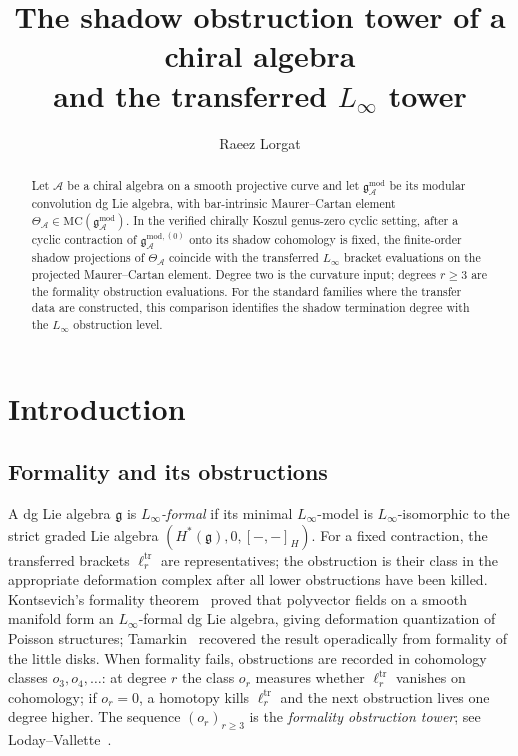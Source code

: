 \documentclass[11pt,reqno]{amsart}
\theoremstyle{definition}
\theoremstyle{remark}
\providecommand{\cA}{\mathcal{A}}
\providecommand{\MC}{\mathrm{MC}}
\providecommand{\fg}{\mathfrak{g}}
\providecommand{\gmod}{\mathfrak{g}^{\mathrm{mod}}_{\cA}}
\providecommand{\gmodzero}{\mathfrak{g}^{\mathrm{mod},(0)}_{\cA}}
\providecommand{\Linf}{L_\infty}
\numberwithin{equation}{section}
\begin{document}
\title[Genus-zero shadow and formality obstruction]
{The shadow obstruction tower of a chiral algebra\\
and the transferred $L_\infty$ tower}

\author{Raeez Lorgat}
\address{Department of Mathematics, Harvard University,
 Cambridge, MA 02138, USA}

\date{}

\begin{abstract}
Let $\cA$ be a chiral algebra on a smooth projective curve and
let $\gmod$ be its modular convolution dg Lie algebra, with
bar-intrinsic Maurer--Cartan element
$\Theta_{\cA}\in\MC(\gmod)$. In the verified chirally Koszul
genus-zero cyclic setting, after a cyclic contraction of
$\gmodzero$ onto its shadow cohomology is fixed, the finite-order
shadow projections of $\Theta_{\cA}$ coincide with the transferred
$\Linf$ bracket evaluations on the projected Maurer--Cartan
element. Degree two is the curvature input; degrees $r\ge 3$ are
the formality obstruction evaluations. For the standard families
where the transfer data are constructed, this comparison identifies
the shadow termination degree with the $\Linf$ obstruction level.
\end{abstract}



\maketitle

\section{Introduction}\label{sec:intro}

\subsection{Formality and its obstructions}

A dg Lie algebra $\fg$ is \emph{$\Linf$-formal} if its minimal
$\Linf$-model is $\Linf$-isomorphic to the strict graded Lie algebra
$(H^*(\fg),0,[-,-]_H)$. For a fixed contraction, the transferred
brackets $\ell_r^{\mathrm{tr}}$ are representatives; the obstruction
is their class in the appropriate deformation complex after all
lower obstructions have been killed.
Kontsevich's formality theorem~\cite{Kontsevich03} proved that
polyvector fields on a smooth manifold form an $\Linf$-formal
dg Lie algebra, giving deformation quantization of Poisson
structures; Tamarkin~\cite{Tamarkin03} recovered the result
operadically from formality of the little disks. When formality
fails, obstructions are recorded in cohomology classes
$o_3,o_4,\dots$: at degree $r$ the class $o_r$ measures whether
$\ell_r^{\mathrm{tr}}$ vanishes on cohomology; if $o_r=0$, a
homotopy kills $\ell_r^{\mathrm{tr}}$ and the next obstruction
lives one degree higher. The sequence $(o_r)_{r\ge 3}$ is the
\emph{formality obstruction tower}; see
Loday--Vallette~\cite[Ch.~10]{LodayVallette12}.
\end{document}
